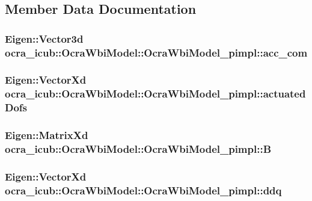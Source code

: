 \subsection{\-Member \-Data \-Documentation}
\hypertarget{structOcraWbiModel_1_1OcraWbiModel__pimpl_ac7d61b2e1fff0ce7f15a472c6785f640}{
\subsubsection[{acc\-\_\-com}]{\setlength{\rightskip}{0pt plus 5cm}\-Eigen\-::\-Vector3d {\bf ocra\-\_\-icub\-::\-Ocra\-Wbi\-Model\-::\-Ocra\-Wbi\-Model\-\_\-pimpl\-::acc\-\_\-com}}}\label{structOcraWbiModel_1_1OcraWbiModel__pimpl_ac7d61b2e1fff0ce7f15a472c6785f640}
\hypertarget{structOcraWbiModel_1_1OcraWbiModel__pimpl_aca1e7991e3aa3941dfb08b58b4f8e82c}{
\subsubsection[{actuated\-Dofs}]{\setlength{\rightskip}{0pt plus 5cm}\-Eigen\-::\-Vector\-Xd {\bf ocra\-\_\-icub\-::\-Ocra\-Wbi\-Model\-::\-Ocra\-Wbi\-Model\-\_\-pimpl\-::actuated\-Dofs}}}\label{structOcraWbiModel_1_1OcraWbiModel__pimpl_aca1e7991e3aa3941dfb08b58b4f8e82c}
\hypertarget{structOcraWbiModel_1_1OcraWbiModel__pimpl_a71a78aa74a5b1422df339991ea6c6974}{
\subsubsection[{\-B}]{\setlength{\rightskip}{0pt plus 5cm}\-Eigen\-::\-Matrix\-Xd {\bf ocra\-\_\-icub\-::\-Ocra\-Wbi\-Model\-::\-Ocra\-Wbi\-Model\-\_\-pimpl\-::\-B}}}\label{structOcraWbiModel_1_1OcraWbiModel__pimpl_a71a78aa74a5b1422df339991ea6c6974}
\hypertarget{structOcraWbiModel_1_1OcraWbiModel__pimpl_a08e61e2559239017a2dcbf99f5777d50}{
\subsubsection[{ddq}]{\setlength{\rightskip}{0pt plus 5cm}\-Eigen\-::\-Vector\-Xd {\bf ocra\-\_\-icub\-::\-Ocra\-Wbi\-Model\-::\-Ocra\-Wbi\-Model\-\_\-pimpl\-::ddq}}}\label{structOcraWbiModel_1_1OcraWbiModel__pimpl_a08e61e2559239017a2dcbf99f5777d50}
